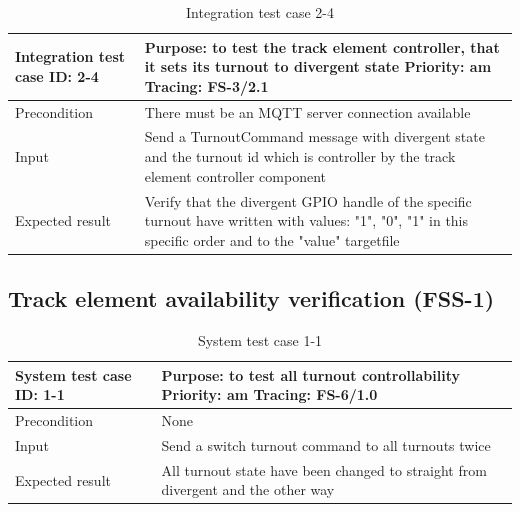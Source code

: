 \begin{table}[H]
	\caption{Integration test case 2-4}
	\label{table:TCase-FSI2-4}
	\begin{center}
		\renewcommand{\arraystretch}{1.8}
		\begin{tabu} 
			to 0.9 \textwidth
			{  X[0.3, l] X[l] }
			\toprule
			Integration test case ID: 2-4 & Purpose: to test the track element controller, that it sets its turnout to divergent state  \newline Priority: am \newline Tracing: FS-3/2.1               \\ \midrule
			Precondition                  & There must be an MQTT server connection available                                                                                                          \\
			Input                         & Send a TurnoutCommand message with divergent state and the turnout id which is controller by the track element controller component                        \\
			Expected result               & Verify that the divergent GPIO handle of the specific turnout have written with values: "1", "0", "1" in this specific order and to the "value" targetfile \\ \bottomrule
		\end{tabu}
	\end{center}
\end{table} 

\subsection{Track element availability verification (FSS-1)}
\begin{table}[H]
	\caption{System test case 1-1}
	\label{table:TCase-FSS1-1}
	\begin{center}
		\renewcommand{\arraystretch}{1.8}
		\begin{tabu} 
			to 0.9 \textwidth
			{  X[0.3, l] X[l] }
			\toprule
			System test case ID: 1-1 & Purpose: to test all turnout controllability    \newline Priority: am \newline Tracing: FS-6/1.0 \\ \midrule
			Precondition             & None                                                                                             \\
			Input                    & Send a switch turnout command to all turnouts twice                                              \\
			Expected result          & All turnout state have been changed to straight from divergent and the other way                 \\ \bottomrule
		\end{tabu}
	\end{center}
\end{table}

